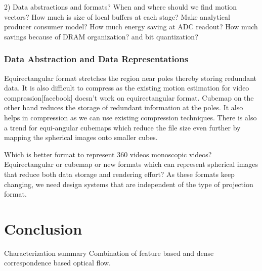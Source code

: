 2)  Data abstractions and formats?
When and where should we find motion vectors?
How much is size of local buffers at each stage? Make analytical producer consumer model?
How much energy saving at ADC readout?
How much savings because of DRAM organization? and bit quantization?

\subsubsection{Data Abstraction and Data Representations}
Equirectangular format stretches the region near poles thereby storing redundant data. It is also difficult to compress as the existing motion estimation for video compression[facebook] doesn't work on equirectangular format. Cubemap on the other hand reduces the storage of redundant information at the poles. It also helps in compression as we can use existing compression techniques. There is also a trend for equi-angular cubemaps which reduce the file size even further by mapping the spherical images onto smaller cubes.\newline

Which is better format to represent 360 videos monoscopic videos? Equirectangular or cubemap or new formats which can represent spherical images that reduce both data storage and rendering effort? As these formats keep changing, we need design systems that are independent of the type of projection format. \newline

\section{Conclusion}

Characterization summary
Combination of feature based and dense correspondence based optical flow. 


